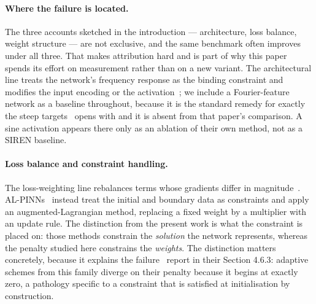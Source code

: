 \documentclass[11pt]{article}
\begin{document}
\paragraph{Where the failure is located.}
The three accounts sketched in the introduction --- architecture, loss balance,
weight structure --- are not exclusive, and the same benchmark often improves
under all three. That makes attribution hard and is part of why this paper
spends its effort on measurement rather than on a new variant. The
architectural line treats the network's frequency response as the binding
constraint and modifies the input encoding or the
activation~\cite{tancik2020fourier, sitzmann2020siren, jagtap2020adaptive};
we include a Fourier-feature network as a baseline throughout, because it is the
standard remedy for exactly the steep targets~\cite{wang2026cnpinn} opens with
and it is absent from that paper's comparison. A sine activation appears there
only as an ablation of their own method, not as a SIREN baseline.

\paragraph{Loss balance and constraint handling.}
The loss-weighting line rebalances terms whose gradients differ in
magnitude~\cite{wang2021gradient, wang2022ntk, mcclenny2023selfadaptive}.
AL-PINNs~\cite{son2023alpinn} instead treat the initial and boundary data as
constraints and apply an augmented-Lagrangian method, replacing a fixed weight
by a multiplier with an update rule. The distinction from the present work is
what the constraint is placed on: those methods constrain the \emph{solution}
the network represents, whereas the penalty studied here constrains the
\emph{weights}. The distinction matters concretely, because it explains the
failure~\cite{wang2026cnpinn} report in their Section 4.6.3: adaptive schemes
from this family diverge on their penalty because it begins at exactly zero, a
pathology specific to a constraint that is satisfied at initialisation by
construction.
\end{document}
